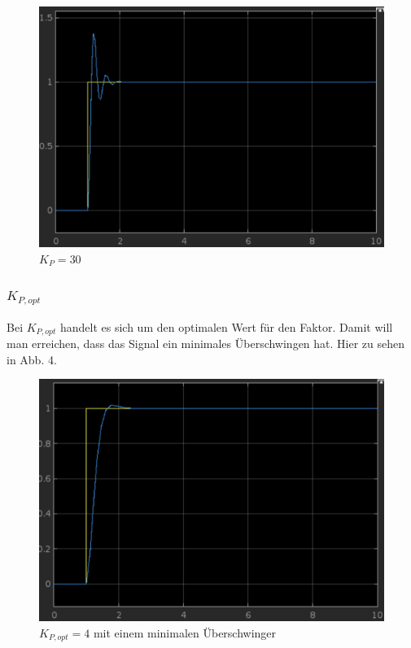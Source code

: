 \documentclass{article}
\begin{document}
\newpage
				\begin{figure}[h]
					\includegraphics[scale=0.225, center]{2_b_2_KP_30.png}
					\caption{$K_P = 30$}
					\label{fig13: Graph_KP_30}
				\end{figure}
			\subsubsection{$K_{P,opt}$}
				Bei $K_{P,opt}$ handelt es sich um den optimalen Wert für den Faktor. Damit will man erreichen, dass das Signal ein minimales Überschwingen hat. Hier zu sehen in Abb. 4.
				\begin{figure}[h]
					\includegraphics[scale=0.225, center]{2_b_2_KP_4.png}
					\caption{$K_{P,opt} = 4$ mit einem minimalen Überschwinger}
					\label{fig14: Graph_KP_4}
				\end{figure}
\newpage
\end{document}
